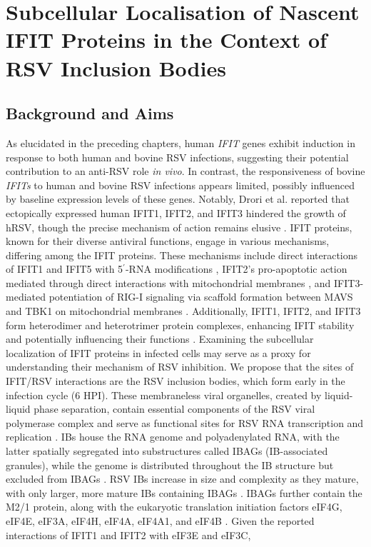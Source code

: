 \chapter{Subcellular Localisation of Nascent IFIT Proteins in the Context of RSV Inclusion Bodies} \label{ch:Subcellular Localisation of Nascent IFIT Proteins in the Context of RSV Inclusion Bodies}
\section{Background and Aims} \label{sec:Background and Aims-Chapter3}
As elucidated in the preceding chapters, human \textit{IFIT} genes exhibit induction in response to both human and bovine RSV infections, suggesting their potential contribution to an anti-RSV role \textit{in vivo}. In contrast, the responsiveness of bovine \textit{IFITs} to human and bovine RSV infections appears limited, possibly influenced by baseline expression levels of these genes. Notably, Drori et al. reported that ectopically expressed human IFIT1, IFIT2, and IFIT3 hindered the growth of hRSV, though the precise mechanism of action remains elusive \cite{Drori2020InfluenzaProteins}. IFIT proteins, known for their diverse antiviral functions, engage in various mechanisms, differing among the IFIT proteins. These mechanisms include direct interactions of IFIT1 and IFIT5 with 5$^{\prime}$-RNA modifications \cite{Abbas2013StructuralProteins, Diamond2014IFIT1:Translation}, IFIT2's pro-apoptotic action mediated through direct interactions with mitochondrial membranes \cite{Chen2017InhibitionApoptosis}, and IFIT3-mediated potentiation of RIG-I signaling via scaffold formation between MAVS and TBK1 on mitochondrial membranes \cite{Liu2011IFN-InducedTBK1}. Additionally, IFIT1, IFIT2, and IFIT3 form heterodimer and heterotrimer protein complexes, enhancing IFIT stability and potentially influencing their functions \cite{Mears2018BetterResponse}. Examining the subcellular localization of IFIT proteins in infected cells may serve as a proxy for understanding their mechanism of RSV inhibition. We propose that the sites of IFIT/RSV interactions are the RSV inclusion bodies, which form early in the infection cycle (6 HPI). These membraneless viral organelles, created by liquid-liquid phase separation, contain essential components of the RSV viral polymerase complex and serve as functional sites for RSV RNA transcription and replication \cite{Rincheval2017FunctionalVirus, Weber1995NonstructuralSerum, Fricke2013P38Assembly, Jobe2021BovineResponses}. IBs house the RNA genome and polyadenylated RNA, with the latter spatially segregated into substructures called IBAGs (IB-associated granules), while the genome is distributed throughout the IB structure but excluded from IBAGs \cite{Rincheval2017FunctionalVirus}. RSV IBs increase in size and complexity as they mature, with only larger, more mature IBs containing IBAGs \cite{Rincheval2017FunctionalVirus, Jobe2021BovineResponses}. IBAGs further contain the M2/1 protein, along with the eukaryotic translation initiation factors eIF4G, eIF4E, eIF3A, eIF4H, eIF4A, eIF4A1, and eIF4B \cite{Rincheval2017FunctionalVirus, Jobe2023ViralCondensates}. Given the reported interactions of IFIT1 and IFIT2 with eIF3E and eIF3C, 